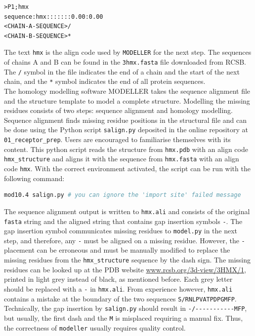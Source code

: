 \documentclass[9pt,tutorial]{livecoms}
\newcommand{\code}[1]{\colorbox{light-gray}{\texttt{#1}}}
\begin{document}
\begin{lstlisting}
>P1;hmx
sequence:hmx:::::::0.00:0.00
<CHAIN-A-SEQUENCE>/
<CHAIN-B-SEQUENCE>*
\end{lstlisting}
The text \code{hmx} is the align code used by \texttt{MODELLER} for the next step. The sequences of chains A and B can be found in the \code{3hmx.fasta} file downloaded from RCSB. The \code{/} symbol in the file indicates the end of a chain and the start of the next chain, and the \code{*} symbol indicates the end of all protein sequences.\\
The homology modelling software MODELLER\cite{SALI1993779} takes the sequence alignment file and the structure template to model a complete structure. Modelling the missing residues consists of two steps: sequence alignment and homology modelling.\\
Sequence alignment finds missing residue positions in the structural file and can be done using the Python script \code{salign.py} deposited in the online repository at \code{01\_receptor\_prep}. Users are encouraged to familiarise themselves with its content. This python script reads the structure from \code{hmx.pdb} with an align code \code{hmx\_structure} and aligns it with the sequence from \code{hmx.fasta} with an align code \code{hmx}. With the correct environment activated, the script can be run with the following command:
\begin{lstlisting}[language=bash]
mod10.4 salign.py # you can ignore the 'import site' failed message
\end{lstlisting}
The sequence alignment output is written to \code{hmx.ali} and consists of the original \texttt{fasta} string and the aligned string that contains gap insertion symbols \code{-}. The gap insertion symbol communicates missing residues to \code{model.py} in the next step, and therefore, any \code{-} must be aligned on a missing residue. However, the \code{-} placement can be erroneous and must be manually modified to replace the missing residues from the \texttt{hmx\_structure} sequence by the dash sign. The missing residues can be looked up at the PDB website \url{www.rcsb.org/3d-view/3HMX/1}, printed in light grey instead of black, as mentioned before. Each grey letter should be replaced with a \code{-} in \code{hmx.ali}. From experience however, \code{hmx.ali} contains a mistake at the boundary of the two sequences \code{S/RNLPVATPDPGMFP}. Technically, the gap insertion by \code{salign.py} should result in \code{-/-{}-{}-{}-{}-{}-{}-{}-{}-{}-{}-MFP}, but usually, the first dash and the \code{M} is misplaced requiring a manual fix. Thus, the correctness of \texttt{modeller} usually requires quality control.\\
\end{document}
